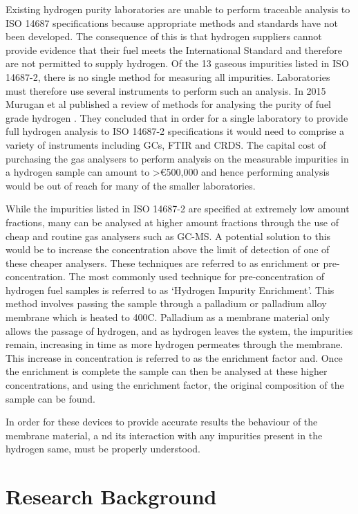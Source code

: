 Existing hydrogen purity laboratories are unable to perform traceable analysis to ISO 14687 
specifications because appropriate methods and standards have not been developed. The consequence 
of this is that hydrogen suppliers cannot provide evidence that their fuel meets the International 
Standard and therefore are not permitted to supply hydrogen. Of the 13 gaseous impurities listed in 
ISO 14687-2, there is no single method for measuring all impurities. Laboratories must therefore use 
several instruments to perform such an analysis.  In 2015 Murugan et al published a review of methods 
for analysing the purity of fuel grade hydrogen \cite{Murugan2015}. They concluded that in order for a single 
laboratory to provide full hydrogen analysis to ISO 14687-2 specifications it would need to comprise 
a variety of instruments including GCs, FTIR and CRDS. The capital cost of purchasing the gas 
analysers to perform analysis on the measurable impurities in a hydrogen sample can amount to 
>€500,000 \cite{Murugan2015} and hence performing analysis would be out of reach for many of the smaller 
laboratories. 

While the impurities listed in ISO 14687-2 are specified at extremely low amount fractions, 
many can be analysed at higher amount fractions through the use of cheap and routine gas 
analysers such as GC-MS. A potential solution to this would be to increase the concentration 
above the limit of detection of one of these cheaper analysers. These techniques are referred 
to as enrichment or pre-concentration. The most commonly used technique for pre-concentration 
of hydrogen fuel samples is referred to as ‘Hydrogen Impurity Enrichment’.  This method involves 
passing the sample through a palladium or palladium alloy membrane which is heated to 400\textdegree C. 
Palladium as a membrane material only allows the passage of hydrogen, and as hydrogen leaves the system, 
the impurities remain, increasing in time as more hydrogen permeates through the membrane.
This increase in concentration is referred to as the enrichment factor and. 
Once the enrichment is complete the sample can then be analysed at these higher concentrations, 
and using the enrichment factor, the original composition of the sample can be found. 

In order for these devices to provide accurate results the behaviour of the membrane material, a
nd its interaction with any impurities present in the hydrogen same, must be properly understood.  


\section{Research Background}
